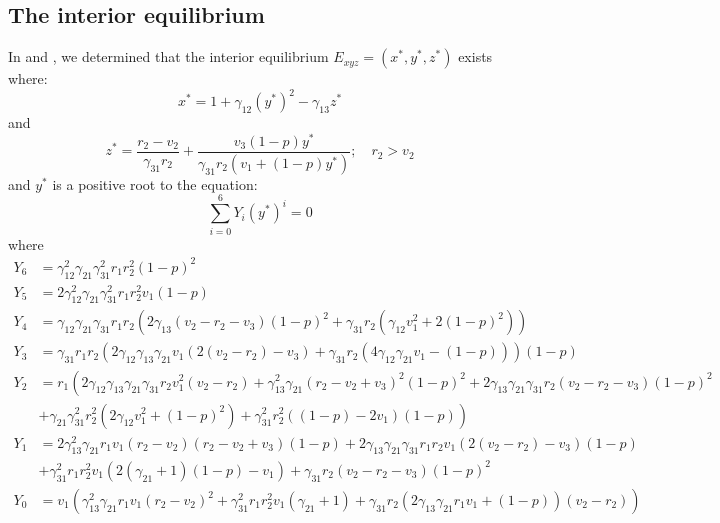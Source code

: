 \subsection{The interior equilibrium}\label{subsec:numsim_interior_equilibrium}
In  and , we determined that the interior equilibrium $E_{xyz}=\left(x^*,y^*,z^*\right)$ exists where:
\[
x^*=1+\gamma_{12}\left(y^*\right)^2-\gamma_{13}z^*
\]
and
\[
z^*=\frac{r_2-v_2}{\gamma_{31}r_2}+\frac{v_3\left(1-p\right)y^*}{\gamma_{31}r_2\left(v_1+\left(1-p\right)y^*\right)};\quad r_2>v_2
\]
and $y^*$ is a positive root to the equation:
\begin{equation*}
    \sum_{i=0}^6 Y_i\left(y^*\right)^i=0
\end{equation*}
where
\begin{align*}
    Y_6 &= \gamma_{12}^2\gamma_{21}\gamma_{31}^2r_1r_2^2\left(1-p\right)^2\\
    Y_5 &= 2\gamma_{12}^2\gamma_{21}\gamma_{31}^2r_1r_2^2v_1\left(1-p\right)\\
    Y_4 &= \gamma_{12}\gamma_{21}\gamma_{31}r_1r_2\left(2\gamma_{13}\left(v_2-r_2-v_3\right)\left(1-p\right)^2+\gamma_{31}r_2\left(\gamma_{12}v_1^2+2\left(1-p\right)^2\right)\right)\\
    Y_3 &= \gamma_{31}r_1r_2\left(2\gamma_{12}\gamma_{13}\gamma_{21}v_1\left(2\left(v_2-r_2\right)-v_3\right)+\gamma_{31}r_2\left(4\gamma_{12}\gamma_{21}v_1-\left(1-p\right)\right)\right)\left(1-p\right)\\
    Y_2 &= r_1\left(2\gamma_{12}\gamma_{13}\gamma_{21}\gamma_{31}r_2v_1^2\left(v_2-r_2\right)+\gamma_{13}^2\gamma_{21}\left(r_2-v_2+v_3\right)^2\left(1-p\right)^2+2\gamma_{13}\gamma_{21}\gamma_{31}r_2\left(v_2-r_2-v_3\right)\left(1-p\right)^2\right.\\
    &\left.+\gamma_{21}\gamma_{31}^2r_2^2\left(2\gamma_{12}v_1^2+\left(1-p\right)^2\right)+\gamma_{31}^2r_2^2\left(\left(1-p\right)-2v_1\right)\left(1-p\right)\right)\\
    Y_1 &= 2\gamma_{13}^2\gamma_{21}r_1v_1\left(r_2-v_2\right)\left(r_2-v_2+v_3\right)\left(1-p\right)+2\gamma_{13}\gamma_{21}\gamma_{31}r_1r_2v_1\left(2\left(v_2-r_2\right)-v_3\right)\left(1-p\right)\\
    &+\gamma_{31}^2r_1r_2^2v_1\left(2\left(\gamma_{21}+1\right)\left(1-p\right)-v_1\right)+\gamma_{31}r_2\left(v_2-r_2-v_3\right)\left(1-p\right)^2\\
    Y_0 &= v_1\left(\gamma_{13}^2\gamma_{21}r_1v_1\left(r_2-v_2\right)^2+\gamma_{31}^2r_1r_2^2v_1\left(\gamma_{21}+1\right)+\gamma_{31}r_2\left(2\gamma_{13}\gamma_{21}r_1v_1+\left(1-p\right)\right)\left(v_2-r_2\right)\right)
\end{align*}
